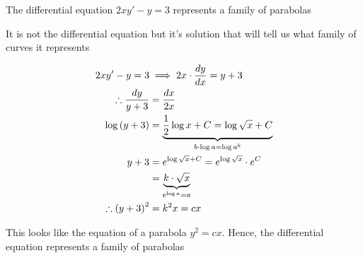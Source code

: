 \documentclass[14pt,fleqn]{extarticle}
\begin{document}
 
\begin{snippet}
    \correct
    
    The differential equation $2xy'-y = 3$ represents a family of parabolas 
    
    \reason
    
    It is not the differential equation but it's solution that will 
    tell us what family of curves it represents 
    
    \begin{align}
	2xy' - y = 3 &\implies 2x\cdot\frac{dy}{dx} = y + 3 \\
	\therefore \frac{dy}{y+3} &= \frac{dx}{2x} \\
	\log \left(y+3 \right) &= \underbrace{\frac{1}{2}\log x + C = \log\sqrt{x} + C}_{b\cdot\log a = \log a^b} \\
	y + 3 &= e^{\log \sqrt{x} + C} = e^{\log \sqrt{x}}\cdot e^C \\
	&= \underbrace{k\cdot \sqrt{x}}_{e^{\log a} = a} \\
	\therefore \left(y+3 \right)^2 &= k^2 x = cx 
\end{align}

This looks like the equation of a parabola $y^2 = cx$. Hence, the differential 
equation represents a family of parabolas 
    
\end{snippet} 
\end{document}
